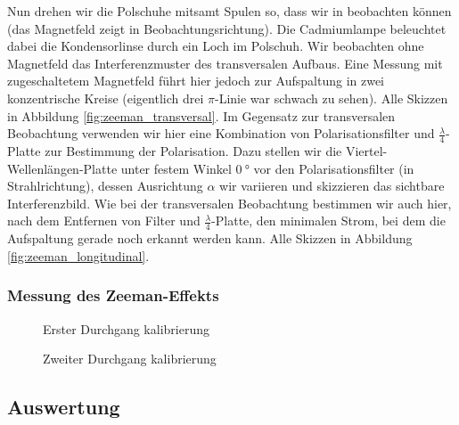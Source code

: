 \documentclass[11pt, a4paper]{article}
\begin{document}
Nun drehen wir die Polschuhe mitsamt Spulen so, dass wir in  beobachten können (das Magnetfeld zeigt in Beobachtungsrichtung).
Die Cadmiumlampe beleuchtet dabei die Kondensorlinse durch ein Loch im Polschuh.
Wir beobachten ohne Magnetfeld das Interferenzmuster des transversalen Aufbaus.
Eine Messung mit zugeschaltetem Magnetfeld führt hier jedoch zur Aufspaltung in zwei konzentrische Kreise (eigentlich drei $\pi$-Linie war schwach zu sehen).
Alle Skizzen in Abbildung \ref{fig:zeeman_transversal}.
Im Gegensatz zur transversalen Beobachtung verwenden wir hier eine Kombination von Polarisationsfilter und $\frac{\lambda}{4}$-Platte zur Bestimmung der Polarisation.
Dazu stellen wir die Viertel-Wellenlängen-Platte unter festem Winkel $\SI{0}{\degree}$ vor den Polarisationsfilter (in Strahlrichtung), dessen Ausrichtung $\alpha$ wir variieren und skizzieren das sichtbare Interferenzbild.
Wie bei der transversalen Beobachtung bestimmen wir auch hier, nach dem Entfernen von Filter und $\frac{\lambda}{4}$-Platte, den minimalen Strom, bei dem die Aufspaltung gerade noch erkannt werden kann.
Alle Skizzen in Abbildung \ref{fig:zeeman_longitudinal}.

\subsubsection{Messung des Zeeman-Effekts}

\begin{figure}[h]
\centering

\caption{Erster Durchgang kalibrierung}
\label{fig:kalibrierung1}
\end{figure}
\begin{figure}[h]
\centering

\caption{Zweiter Durchgang kalibrierung}
\label{fig:kalibrierung2}
\end{figure}

\FloatBarrier

\subsection{Auswertung}
\end{document}
